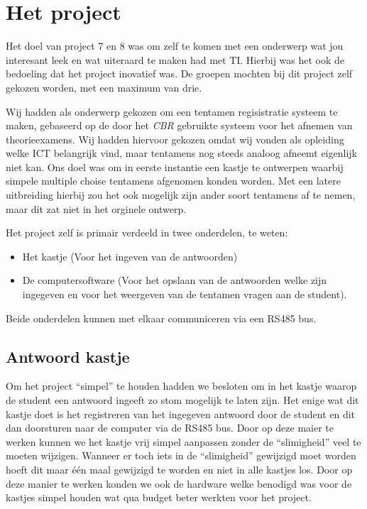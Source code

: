 \chapter{Het project}
Het doel van project 7 en 8 was om zelf te komen met een onderwerp wat jou interesant leek en wat uiteraard te maken had met TI. Hierbij was het ook de bedoeling dat het project inovatief was. De groepen mochten bij dit project zelf gekozen worden, met een maximum van drie.

Wij hadden als onderwerp gekozen om een tentamen regisistratie systeem te maken, gebaseerd op de door het \emph{CBR} gebruikte systeem voor het afnemen van theorieexamens. Wij hadden hiervoor gekozen omdat wij vonden als opleiding welke ICT belangrijk vind, maar tentamens nog steeds analoog afneemt eigenlijk niet kan. Ons doel was om in eerste instantie een kastje te ontwerpen waarbij simpele multiple choise tentamens afgenomen konden worden. Met een latere uitbreiding hierbij zou het ook mogelijk zijn ander soort tentamens af te nemen, maar dit zat niet in het orginele ontwerp.

Het project zelf is primair verdeeld in twee onderdelen, te weten:
\begin{itemize}
  \item Het kastje (Voor het ingeven van de antwoorden)
  \item De computersoftware (Voor het opslaan van de antwoorden welke zijn ingegeven en voor het weergeven van de tentamen vragen aan de student).
\end{itemize}
Beide onderdelen kunnen met elkaar communiceren via een RS485 bus. 

\section{Antwoord kastje}
Om het project ``simpel'' te houden hadden we besloten om in het kastje waarop de student een antwoord ingeeft zo stom mogelijk te laten zijn. Het enige wat dit kastje doet is het registreren van het ingegeven antwoord door de student en dit dan doorsturen naar de computer via de RS485 bus. Door op deze maier te werken kunnen we het kastje vrij simpel aanpassen zonder de ``slimigheid'' veel te moeten wijzigen. Wanneer er toch iets in de ``slimigheid'' gewijzigd moet worden hoeft dit maar \'{e}\'{e}n maal gewijzigd te worden en niet in alle kastjes los. Door op deze manier te werken konden we ook de hardware welke benodigd was voor de kastjes simpel houden wat qua budget beter werkten voor het project. 

